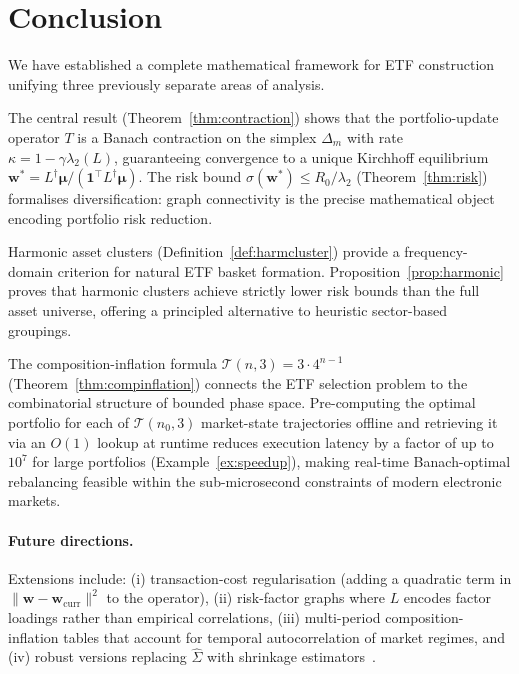 \documentclass[twocolumn,11pt,a4paper]{article}
\theoremstyle{remark}
\newcommand{\one}{\mathbf{1}}
\newcommand{\bw}{\mathbf{w}}
\newcommand{\bmu}{\bm{\mu}}
\newcommand{\Dm}{\Delta_m}
\newcommand{\Ld}{L^\dagger}
\newcommand{\lam}[1]{\lambda_{#1}}
\newcommand{\kap}{\kappa}
\newcommand{\T}{\mathcal{T}}
\begin{document}
\section{Conclusion}
\label{sec:conclusion}

We have established a complete mathematical framework for ETF construction
unifying three previously separate areas of analysis.

The central result (Theorem~\ref{thm:contraction}) shows that the portfolio-update
operator $T$ is a Banach contraction on the simplex $\Dm$ with rate
$\kap = 1 - \gamma\lam{2}(L)$, guaranteeing convergence to a unique Kirchhoff
equilibrium $\bw^* = \Ld\bmu/(\one^\top\Ld\bmu)$. The risk bound
$\sigma(\bw^*) \leq R_0/\lam{2}$ (Theorem~\ref{thm:risk}) formalises diversification:
graph connectivity is the precise mathematical object encoding portfolio risk reduction.

Harmonic asset clusters (Definition~\ref{def:harmcluster}) provide a frequency-domain
criterion for natural ETF basket formation. Proposition~\ref{prop:harmonic} proves
that harmonic clusters achieve strictly lower risk bounds than the full asset universe,
offering a principled alternative to heuristic sector-based groupings.

The composition-inflation formula $\T(n,3)=3\cdot 4^{n-1}$ (Theorem~\ref{thm:compinflation})
connects the ETF selection problem to the combinatorial structure of bounded phase space.
Pre-computing the optimal portfolio for each of $\T(n_0,3)$ market-state trajectories
offline and retrieving it via an $O(1)$ lookup at runtime reduces execution latency by
a factor of up to $10^7$ for large portfolios (Example~\ref{ex:speedup}),
making real-time Banach-optimal rebalancing feasible within the sub-microsecond
constraints of modern electronic markets.

\paragraph{Future directions.}
Extensions include: (i) transaction-cost regularisation
(adding a quadratic term in $\|\bw-\bw_{\text{curr}}\|^2$ to the operator),
(ii) risk-factor graphs where $L$ encodes factor loadings rather than
empirical correlations, (iii) multi-period composition-inflation tables
that account for temporal autocorrelation of market regimes, and
(iv) robust versions replacing $\hat\Sigma$ with shrinkage estimators~\cite{ledoit2004}.




\end{document}
